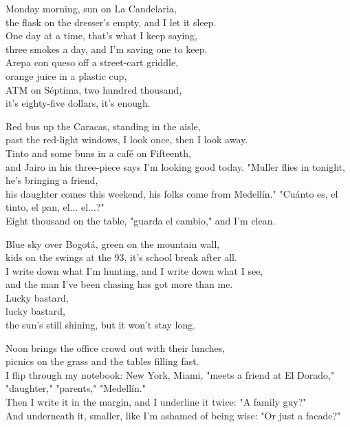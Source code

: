 \begin{lyrics}

Monday morning, sun on La Candelaria,\\
the flask on the dresser's empty, and I let it sleep.\\
One day at a time, that's what I keep saying,\\
three smokes a day, and I'm saving one to keep.\\
Arepa con queso off a street-cart griddle,\\
orange juice in a plastic cup,\\
ATM on Séptima, two hundred thousand,\\
it's eighty-five dollars, it's enough.

Red bus up the Caracas, standing in the aisle,\\
past the red-light windows, I look once, then I look away.\\
Tinto and some buns in a café on Fifteenth,\\
and Jairo in his three-piece says I'm looking good today.
"Muller flies in tonight, he's bringing a friend,\\
his daughter comes this weekend, his folks come from Medellín."
"Cuánto es, el tinto, el pan, el... el...?"\\
Eight thousand on the table, "guarda el cambio," and I'm clean.

Blue sky over Bogotá, green on the mountain wall,\\
kids on the swings at the 93, it's school break after all.\\
I write down what I'm hunting, and I write down what I see,\\
and the man I've been chasing has got more than me.\\
Lucky bastard,\\
lucky bastard,\\
the sun's still shining, but it won't stay long.

Noon brings the office crowd out with their lunches,\\
picnics on the grass and the tables filling fast.\\
I flip through my notebook: New York, Miami,
"meets a friend at El Dorado," "daughter," "parents," "Medellín."\\
Then I write it in the margin, and I underline it twice:
"A family guy?"\\
And underneath it, smaller, like I'm ashamed of being wise:
"Or just a facade?"


\end{lyrics}
